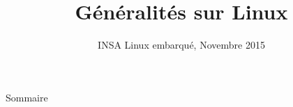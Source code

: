 \documentclass{beamer}
\title[Linux - Généralités]
{Généralités sur Linux}
\date[Novembre 2015]
{INSA Linux embarqué, Novembre 2015}
\begin{document}
\begin{frame}
  \titlepage
\end{frame}

\begin{frame}{Sommaire}
  \tableofcontents
\end{frame}










\end{document}
